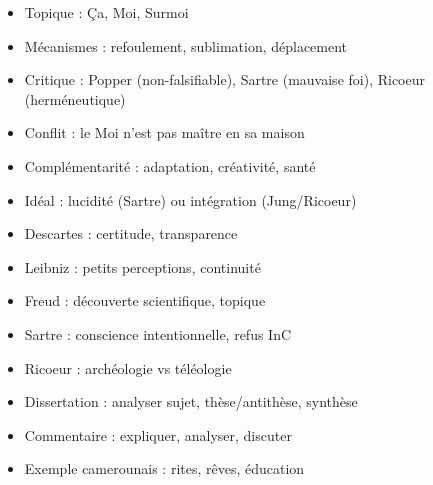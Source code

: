 \documentclass[11pt]{article}
\begin{document}
\begin{popfigure}
\begin{tcbraster}[raster columns=3,raster equal height=rows,raster column skip=6pt,raster row skip=6pt,enhanced,blankest]
\begin{tcolorbox}
\begin{itemize}[nosep,leftmargin=*,itemsep=1pt,font=\scriptsize]
\item Topique : Ça, Moi, Surmoi
\item Mécanismes : refoulement, sublimation, déplacement
\item Critique : Popper (non-falsifiable), Sartre (mauvaise foi), Ricoeur (herméneutique)
\end{itemize}
\end{tcolorbox}
\begin{tcolorbox}[enhanced,colback=white,colframe=poppurple,boxrule=0.9pt,arc=3pt,title={4. Articulation C/InC},fonttitle=\bfseries\scriptsize,coltitle=white,colbacktitle=poppurple,left=4pt,right=4pt,top=2pt,bottom=2pt,boxsep=1pt,toptitle=1.5pt,bottomtitle=1.5pt,halign=left]
\begin{itemize}[nosep,leftmargin=*,itemsep=1pt,font=\scriptsize]
\item Conflit : le Moi n'est pas maître en sa maison
\item Complémentarité : adaptation, créativité, santé
\item Idéal : lucidité (Sartre) ou intégration (Jung/Ricoeur)
\end{itemize}
\end{tcolorbox}
\begin{tcolorbox}[enhanced,colback=white,colframe=popgold,boxrule=0.9pt,arc=3pt,title={5. Auteurs clés},fonttitle=\bfseries\scriptsize,coltitle=white,colbacktitle=popgold,left=4pt,right=4pt,top=2pt,bottom=2pt,boxsep=1pt,toptitle=1.5pt,bottomtitle=1.5pt,halign=left]
\begin{itemize}[nosep,leftmargin=*,itemsep=1pt,font=\scriptsize]
\item Descartes : certitude, transparence
\item Leibniz : petits perceptions, continuité
\item Freud : découverte scientifique, topique
\item Sartre : conscience intentionnelle, refus InC
\item Ricoeur : archéologie vs téléologie
\end{itemize}
\end{tcolorbox}
\begin{tcolorbox}[enhanced,colback=white,colframe=poppink,boxrule=0.9pt,arc=3pt,title={6. Méthodes Bac},fonttitle=\bfseries\scriptsize,coltitle=white,colbacktitle=poppink,left=4pt,right=4pt,top=2pt,bottom=2pt,boxsep=1pt,toptitle=1.5pt,bottomtitle=1.5pt,halign=left]
\begin{itemize}[nosep,leftmargin=*,itemsep=1pt,font=\scriptsize]
\item Dissertation : analyser sujet, thèse/antithèse, synthèse
\item Commentaire : expliquer, analyser, discuter
\item Exemple camerounais : rites, rêves, éducation
\end{itemize}
\end{tcolorbox}
\end{tcbraster}


\end{popfigure}
\end{document}
